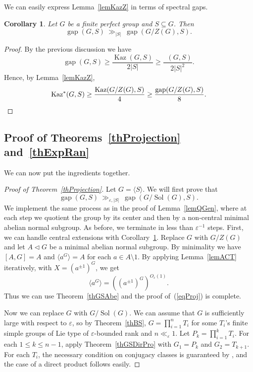 \documentclass[11pt,reqno]{amsart}
\numberwithin{equation}{section}
\newtheorem{corollary}[theorem]{Corollary}
\theoremstyle{definition}
\theoremstyle{remark}
\newcommand{\Sol}{\mathop{\mathrm{Sol}}}
\newcommand{\Kaz}{\mathop{\mathrm{Kaz}}}
\newcommand{\Kazz}{\mathop{\mathrm{Kaz^*}}}
\newcommand{\gap}{\mathop{\mathrm{gap}}}
\begin{document}
We can easily express Lemma~\ref{lemKazZ} in terms of spectral gaps.

\begin{corollary} \label{corExpC}
Let $G$ be a finite perfect group and $S \subseteq G$.
Then
$$ \gap(G,S) \> \gg_{|S|} \> \gap(G/Z(G),S) . $$
\end{corollary}
\begin{proof}
By the previous discussion we have
$$ \gap(G,S) \geq \frac{\Kaz(G,S)}{2|S|} \geq \frac{\Kazz(G,S)}{2|S|^2} . $$
Hence, by Lemma~\ref{lemKazZ},
$$ \Kazz(G,S) \geq \frac{\Kaz(G/Z(G),S)}{4} \geq \frac{\gap(G/Z(G),S)}{8} . \qedhere $$
\end{proof}

\subsection{Proof of Theorems~\ref{thProjection} and~\ref{thExpRan}} 

We can now put the ingredients together.

\begin{proof}[Proof of Theorem~\ref{thProjection}]
Let $G = \langle S \rangle$.
We will first prove that
\begin{equation} \label{eqProj}
\gap(G,S) \> \gg_{\varepsilon,|S|} \> \gap(G/\Sol(G),S) . 
\end{equation} 
We implement the same process as in the proof of Lemma~\ref{lemQGen},
where at each step we quotient the group by its center
and then by a non-central minimal abelian normal subgroup.
As before, we terminate in less than $\varepsilon^{-1}$ steps.
First, we can handle central extensions with Corollary~\ref{corExpC}.
Replace $G$ with $G/Z(G)$ and let $A \lhd G$ be a minimal abelian normal subgroup.
By minimality we have $[A,G]=A$ and $\langle a^{G} \rangle =A$ for each $a \in A \setminus 1$.
By applying Lemma~\ref{lemACT} iteratively, with $X=(a^{\pm 1})^{G}$, we get
$$ \langle a^{G} \rangle = ((a^{\pm 1})^{G})^{O_\varepsilon(1)} . $$
Thus we can use Theorem~\ref{thGSAbe} and the proof of~(\ref{eqProj}) is complete.

Now we can replace $G$ with $G/\Sol(G)$.
We can assume that $G$ is sufficiently large with respect to $\varepsilon$, so
by Theorem~\ref{thBS}, $G = \prod_{i=1}^n T_i$
for some $T_i$'s finite simple groups of Lie type of $\varepsilon$-bounded rank and $n \ll_\varepsilon 1$.
Let $P_k = \prod_{i=1}^{k} T_i$.
For each $1 \leq k \leq n-1$, apply Theorem~\ref{thGSDirPro} with $G_1=P_k$ and $G_2=T_{k+1}$.
For each $T_i$, the necessary condition on conjugacy classes is guaranteed by \cite[Theorem~1]{LL98},
and the case of a direct product follows easily.
\end{proof}
\end{document}
